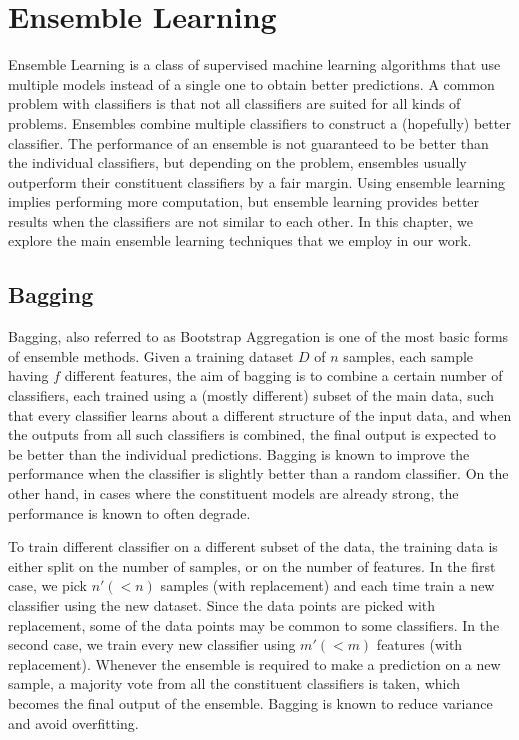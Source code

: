 \chapter{Ensemble Learning}
\label{chapter:Ensemble Learning}

Ensemble Learning is a class of supervised machine learning algorithms that use multiple models instead of a single one to obtain better predictions. A common problem with classifiers is that not all classifiers are suited for all kinds of problems. Ensembles combine multiple classifiers to construct a (hopefully) better classifier. The performance of an ensemble is not guaranteed to be better than the individual classifiers, but depending on the problem, ensembles usually outperform their constituent classifiers by a fair margin. Using ensemble learning implies performing more computation, but ensemble learning provides better results when the classifiers are not similar to each other. In this chapter, we explore the main ensemble learning techniques that we employ in our work.

\section{Bagging}
Bagging, also referred to as Bootstrap Aggregation is one of the most basic forms of ensemble methods. Given a training dataset $D$ of $n$ samples, each sample having $f$ different features, the aim of bagging is to combine a certain number of classifiers, each trained using a (mostly different) subset of the main data, such that every classifier learns about a different structure of the input data, and when the outputs from all such classifiers is combined, the final output is expected to be better than the individual predictions. Bagging is known to improve the performance when the classifier is slightly better than a random classifier. On the other hand, in cases where the constituent models are already strong, the performance is known to often degrade.

To train different classifier on a different subset of the data, the training data is either split on the number of samples, or on the number of features. In the first case, we pick $n' (< n)$ samples (with replacement) and each time train a new classifier using the new dataset. Since the data points are picked with replacement, some of the data points may be common to some classifiers. In the second case, we train every new classifier using $m' (< m)$ features (with replacement). Whenever the ensemble is required to make a prediction on a new sample, a majority vote from all the constituent classifiers is taken, which becomes the final output of the ensemble. Bagging is known to reduce variance and avoid overfitting.

